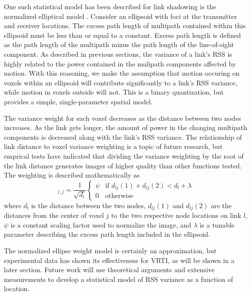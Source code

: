 \documentclass[journal]{IEEEtran}
\begin{document}
One such statistical model has been described for link shadowing is the normalized elliptical model \cite{Agrawal08}. Consider an ellipsoid with foci at the transmitter and receiver locations. The excess path length of multipath contained within this ellipsoid must be less than or equal to a constant.  Excess path length is defined as the path length of the multipath minus the path length of the line-of-sight component. As described in previous sections, the variance of a link's RSS is highly related to the power contained in the mulipath components affected by motion. With this reasoning, we make the assumption that motion occuring on voxels within an ellipsoid will contribute significantly to a link's RSS variance, while motion in voxels outside will not. This is a binary quantization, but provides a simple, single-parameter spatial model.

The variance weight for each voxel decreases as the distance between two nodes increases.  As the link gets longer, the amount of power in the changing multipath components is decreased along with the link's RSS variance. The relationship of link distance to voxel variance weighting is a topic of future research, but emprical tests have indicated that dividing the variance weighting by the root of the link distance generates images of higher quality than other functions tested. The weighting is described mathematically as
\begin{equation}
[W]_{l,j} = \frac{1}{\sqrt{d_l}}\left\{ {
\begin{array}{cc}
\psi & \mbox{if $d_{lj}(1) + d_{lj}(2) < d_l + \lambda$} \\
0 & \mbox{otherwise} 
\end{array}}
\right .
\label{eq.ellipse}
\end{equation} 
where $d_l$ is the distance between the two nodes, $d_{lj}(1)$ and $d_{lj}(2)$ are the distances from the center of voxel $j$ to the two respective node locations on link $l$, $\psi$ is a constant scaling factor used to normalize the image, and $\lambda$ is a tunable parameter describing the excess path length included in the ellipsoid.

The normalized ellipse weight model is certainly an approximation, but experimental data has shown its effectiveness for VRTI, as will be shown in a later section. Future work will use theoretical arguments and extensive measurements to develop a statistical model of RSS variance as a function of location.
\end{document}
